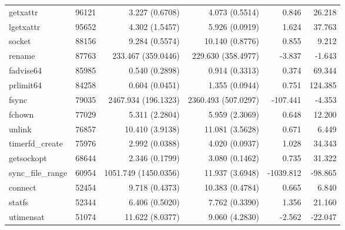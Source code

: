 \begin{longtable}{>{\ttfamily}lrrrrr}
                       getxattr &      96121 &              3.227 (0.6708) &            4.073 (0.5514) &           0.846 &       26.218 \\
                      lgetxattr &      95652 &              4.302 (1.5457) &            5.926 (0.0919) &           1.624 &       37.763 \\
                         socket &      88156 &              9.284 (0.5574) &           10.140 (0.8776) &           0.855 &        9.212 \\
                         rename &      87763 &          233.467 (359.0446) &        229.630 (358.4977) &          -3.837 &       -1.643 \\
                      fadvise64 &      85985 &              0.540 (0.2898) &            0.914 (0.3313) &           0.374 &       69.344 \\
                      prlimit64 &      84258 &              0.604 (0.0451) &            1.355 (0.0944) &           0.751 &      124.385 \\
                          fsync &      79035 &         2467.934 (196.1323) &       2360.493 (507.0297) &        -107.441 &       -4.353 \\
                         fchown &      77029 &              5.311 (2.2804) &            5.959 (2.3069) &           0.648 &       12.200 \\
                         unlink &      76857 &             10.410 (3.9138) &           11.081 (3.5628) &           0.671 &        6.449 \\
                timerfd\_create &      75976 &              2.992 (0.0388) &            4.020 (0.0937) &           1.028 &       34.343 \\
                     getsockopt &      68644 &              2.346 (0.1799) &            3.080 (0.1462) &           0.735 &       31.322 \\
              sync\_file\_range &      60954 &        1051.749 (1450.0356) &           11.937 (3.6948) &       -1039.812 &      -98.865 \\
                        connect &      52454 &              9.718 (0.4373) &           10.383 (0.4784) &           0.665 &        6.840 \\
                         statfs &      52344 &              6.406 (0.5020) &            7.762 (0.3390) &           1.356 &       21.160 \\
                      utimensat &      51074 &             11.622 (8.0377) &            9.060 (4.2830) &          -2.562 &      -22.047 \\

\end{longtable}
